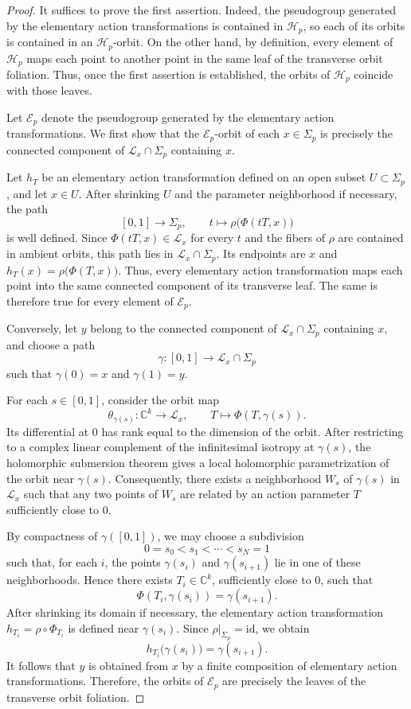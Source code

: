 \documentclass[11pt]{amsart}
\theoremstyle{definition}
\theoremstyle{remark}
\newcommand{\C}{\mathbb{C}}
\newcommand{\leaf}[1]{\mathcal{L}_{#1}}
\begin{document}
 
\begin{proof}
It suffices to prove the first assertion. Indeed, the pseudogroup generated by the elementary action transformations is contained in $\mathcal H_p$, so each of its orbits is contained in an $\mathcal H_p$-orbit. 
On the other hand, by definition, every element of $\mathcal H_p$ maps each point to another point in the same leaf of the transverse orbit foliation. 
Thus, once the first assertion is established, the orbits of $\mathcal H_p$ coincide with those leaves.

Let $\mathcal E_p$ denote the pseudogroup generated by the elementary
action transformations. We first show that the $\mathcal E_p$-orbit
of each $x\in\Sigma_p$ is precisely the connected component of
$\leaf{x}\cap\Sigma_p$ containing $x$.

Let $h_T$ be an elementary action transformation defined on an open
subset $U\subset\Sigma_p$, and let $x\in U$. After shrinking $U$ and
the parameter neighborhood if necessary, the path
\[
    [0,1]\longrightarrow\Sigma_p,
    \qquad
    t\longmapsto\rho\bigl(\Phi(tT,x)\bigr)
\]
is well defined. Since $\Phi(tT,x)\in\leaf{x}$ for every $t$ and the
fibers of $\rho$ are contained in ambient orbits, this path lies in
$\leaf{x}\cap\Sigma_p$. Its endpoints are $x$ and
$h_T(x)=\rho\bigl(\Phi(T,x)\bigr)$. Thus, every elementary action
transformation maps each point into the same connected component of
its transverse leaf. The same is therefore true for every element of
$\mathcal E_p$.

Conversely, let $y$ belong to the connected component of
$\leaf{x}\cap\Sigma_p$ containing $x$, and choose a path
\[
    \gamma:[0,1]\longrightarrow\leaf{x}\cap\Sigma_p
\]
such that $\gamma(0)=x$ and $\gamma(1)=y$.

For each $s\in[0,1]$, consider the orbit map
\[
    \theta_{\gamma(s)}:\C^k\longrightarrow\leaf{x},
    \qquad
    T\longmapsto\Phi(T,\gamma(s)).
\]
Its differential at $0$ has rank equal to the dimension of the orbit.
After restricting to a complex linear complement of the infinitesimal
isotropy at $\gamma(s)$, the holomorphic submersion theorem gives a
local holomorphic parametrization of the orbit near $\gamma(s)$.
Consequently, there exists a neighborhood $W_s$ of $\gamma(s)$ in
$\leaf{x}$ such that any two points of $W_s$ are related by an action
parameter $T$ sufficiently close to $0$.

By compactness of $\gamma([0,1])$, we may choose a subdivision
\[
    0=s_0<s_1<\cdots<s_N=1
\]
such that, for each $i$, the points $\gamma(s_i)$ and
$\gamma(s_{i+1})$ lie in one of these neighborhoods. Hence there
exists $T_i\in\C^k$, sufficiently close to $0$, such that
\[
    \Phi(T_i,\gamma(s_i))=\gamma(s_{i+1}).
\]
After shrinking its domain if necessary, the elementary action
transformation $h_{T_i}=\rho\circ\Phi_{T_i}$ is defined near
$\gamma(s_i)$. Since $\rho|_{\Sigma_p}=\mathrm{id}$, we obtain
\[
    h_{T_i}\bigl(\gamma(s_i)\bigr)
    =
    \gamma(s_{i+1}).
\]
It follows that $y$ is obtained from $x$ by a finite composition of
elementary action transformations. Therefore, the orbits of
$\mathcal E_p$ are precisely the leaves of the transverse orbit
foliation.


\end{proof}
\end{document}
